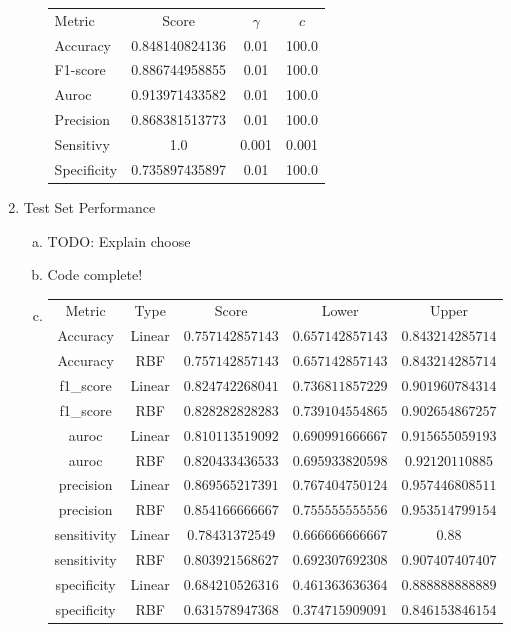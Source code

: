\documentclass[11pt]{article}
\begin{document}
\begin{enumerate}[(2)]
\begin{enumerate}[(a)]
\begin{tabular}{| l | c | c | c |}
\hline
Metric & Score & $\gamma$ & $c$ \\
Accuracy & 0.848140824136 & 0.01 & 100.0 \\
F1-score & 0.886744958855 & 0.01 & 100.0 \\
Auroc & 0.913971433582 & 0.01 & 100.0 \\
Precision & 0.868381513773 & 0.01 & 100.0 \\
Sensitivy & 1.0 & 0.001 & 0.001 \\
Specificity & 0.735897435897 & 0.01 & 100.0 \\
\hline
\end{tabular}
\end{enumerate}
\item Test Set Performance
\begin{enumerate}[(a)]
\item TODO: Explain choose
\item Code complete!
\item 
\begin{tabular}{| c | c | c | c | c |}
\hline
Metric & Type &Score & Lower & Upper \\
Accuracy & Linear & $0.757142857143$ & $0.657142857143$ & $0.843214285714$ \\
Accuracy & RBF & $0.757142857143$ & $0.657142857143$ & $0.843214285714$ \\
f1\_score & Linear & $0.824742268041$ & $0.736811857229$ & $0.901960784314$ \\
f1\_score & RBF & $0.828282828283$ & $0.739104554865$ & $0.902654867257$ \\
auroc & Linear & $0.810113519092$ & $0.690991666667$ & $0.915655059193$ \\
auroc & RBF & $0.820433436533$ & $0.695933820598$ & $0.92120110885$ \\
precision & Linear & $0.869565217391$ & $0.767404750124$ & $0.957446808511$ \\
precision & RBF & $0.854166666667$ & $0.755555555556$ & $0.953514799154$ \\
sensitivity & Linear & $0.78431372549$ & $0.666666666667$ & $0.88$ \\
sensitivity & RBF & $0.803921568627$ & $0.692307692308$ & $0.907407407407$ \\
specificity & Linear & $0.684210526316$ & $0.461363636364$ & $0.888888888889$ \\
specificity & RBF & $0.631578947368$ & $0.374715909091$ & $0.846153846154$ \\
\hline
\end{tabular} \\
\end{enumerate}
\end{enumerate}
\end{document}
